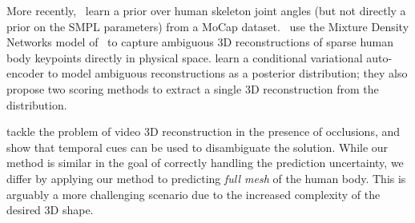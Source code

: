More recently,~\citet{akhter15pose-conditioned} learn a prior over human skeleton joint angles (but not directly a prior on the SMPL parameters) from a MoCap dataset.~\citet{li19generating} use the Mixture Density Networks model of~\cite{bishop94mixture} to capture ambiguous 3D reconstructions of sparse human body keypoints directly in physical space.
\citet{sharma19monocular} learn a conditional variational auto-encoder to model ambiguous reconstructions as a posterior distribution; they also propose two scoring methods to extract a single 3D reconstruction from the distribution.


\citet{cheng19occlusion-aware} tackle the problem of video 3D reconstruction in the presence of occlusions, and show that temporal cues can be used to disambiguate the solution.
While our method is similar in the goal of correctly handling the prediction uncertainty, we differ by applying our method to predicting \emph{full mesh} of the human body.
This is arguably a more challenging scenario due to the increased complexity of the desired 3D shape.

